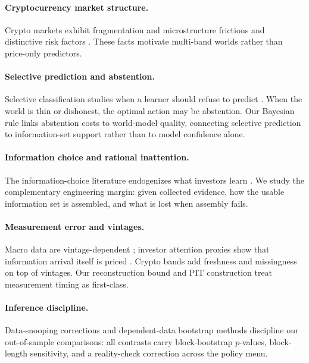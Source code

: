 \documentclass[12pt]{article}
\begin{document}
\paragraph{Cryptocurrency market structure.}
Crypto markets exhibit fragmentation and microstructure frictions \citep{makarov2020} and distinctive risk factors \citep{liu2022}. These facts motivate multi-band worlds rather than price-only predictors.

\paragraph{Selective prediction and abstention.}
Selective classification studies when a learner should refuse to predict \citep{elyaniv2010,geifman2017}. When the world is thin or dishonest, the optimal action may be abstention. Our Bayesian rule links abstention costs to world-model quality, connecting selective prediction to information-set support rather than to model confidence alone.

\paragraph{Information choice and rational inattention.}
The information-choice literature endogenizes what investors learn \citep{sims2003,veldkamp2011}. We study the complementary engineering margin: given collected evidence, how the usable information set is assembled, and what is lost when assembly fails.

\paragraph{Measurement error and vintages.}
Macro data are vintage-dependent \citep{croushore2001}; investor attention proxies show that information arrival itself is priced \citep{da2011}. Crypto bands add freshness and missingness on top of vintages. Our reconstruction bound and PIT construction treat measurement timing as first-class.

\paragraph{Inference discipline.}
Data-snooping corrections \citep{white2000,hansen2005,harvey2016} and dependent-data bootstrap methods \citep{politis1994,ledoit2008} discipline our out-of-sample comparisons: all contrasts carry block-bootstrap $p$-values, block-length sensitivity, and a reality-check correction across the policy menu.
\end{document}
